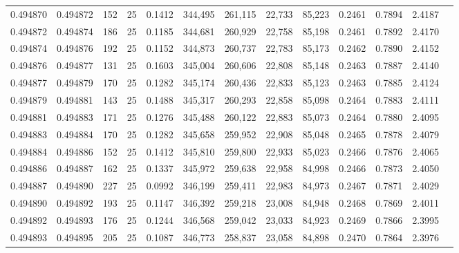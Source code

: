 \begin{tabular}{rrrrrrrrrrrrr}
0.494870 & 0.494872 &   152 &  25 &                                     0.1412 & 344,495 & 261,115 &  22,733 &  85,223 & 0.2461 & 0.7894 & 2.4187 \\
0.494872 & 0.494874 &   186 &  25 &                                     0.1185 & 344,681 & 260,929 &  22,758 &  85,198 & 0.2461 & 0.7892 & 2.4170 \\
0.494874 & 0.494876 &   192 &  25 &                                     0.1152 & 344,873 & 260,737 &  22,783 &  85,173 & 0.2462 & 0.7890 & 2.4152 \\
0.494876 & 0.494877 &   131 &  25 &                                     0.1603 & 345,004 & 260,606 &  22,808 &  85,148 & 0.2463 & 0.7887 & 2.4140 \\
0.494877 & 0.494879 &   170 &  25 &                                     0.1282 & 345,174 & 260,436 &  22,833 &  85,123 & 0.2463 & 0.7885 & 2.4124 \\
0.494879 & 0.494881 &   143 &  25 &                                     0.1488 & 345,317 & 260,293 &  22,858 &  85,098 & 0.2464 & 0.7883 & 2.4111 \\
0.494881 & 0.494883 &   171 &  25 &                                     0.1276 & 345,488 & 260,122 &  22,883 &  85,073 & 0.2464 & 0.7880 & 2.4095 \\
0.494883 & 0.494884 &   170 &  25 &                                     0.1282 & 345,658 & 259,952 &  22,908 &  85,048 & 0.2465 & 0.7878 & 2.4079 \\
0.494884 & 0.494886 &   152 &  25 &                                     0.1412 & 345,810 & 259,800 &  22,933 &  85,023 & 0.2466 & 0.7876 & 2.4065 \\
0.494886 & 0.494887 &   162 &  25 &                                     0.1337 & 345,972 & 259,638 &  22,958 &  84,998 & 0.2466 & 0.7873 & 2.4050 \\
0.494887 & 0.494890 &   227 &  25 &                                     0.0992 & 346,199 & 259,411 &  22,983 &  84,973 & 0.2467 & 0.7871 & 2.4029 \\
0.494890 & 0.494892 &   193 &  25 &                                     0.1147 & 346,392 & 259,218 &  23,008 &  84,948 & 0.2468 & 0.7869 & 2.4011 \\
0.494892 & 0.494893 &   176 &  25 &                                     0.1244 & 346,568 & 259,042 &  23,033 &  84,923 & 0.2469 & 0.7866 & 2.3995 \\
0.494893 & 0.494895 &   205 &  25 &                                     0.1087 & 346,773 & 258,837 &  23,058 &  84,898 & 0.2470 & 0.7864 & 2.3976 \\

\end{tabular}
